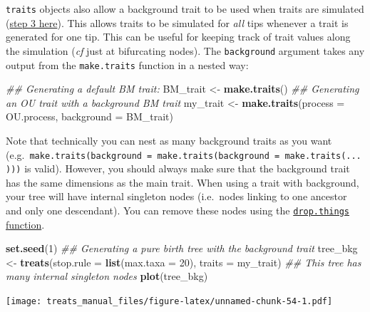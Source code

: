 \documentclass[
]{book}
\newenvironment{Shaded}{\begin{snugshade}}{\end{snugshade}}
\newcommand{\CommentTok}[1]{\textcolor[rgb]{0.56,0.35,0.01}{\textit{#1}}}
\newcommand{\DataTypeTok}[1]{\textcolor[rgb]{0.13,0.29,0.53}{#1}}
\newcommand{\DecValTok}[1]{\textcolor[rgb]{0.00,0.00,0.81}{#1}}
\newcommand{\KeywordTok}[1]{\textcolor[rgb]{0.13,0.29,0.53}{\textbf{#1}}}
\newcommand{\NormalTok}[1]{#1}
\newcommand{\StringTok}[1]{\textcolor[rgb]{0.31,0.60,0.02}{#1}}
\begin{document}
\texttt{traits} objects also allow a background trait to be used when traits are simulated (\protect\hyperlink{bdalgorithm}{step 3 here}).
This allows traits to be simulated for \emph{all} tips whenever a trait is generated for one tip.
This can be useful for keeping track of trait values along the simulation (\emph{cf} just at bifurcating nodes).
The \texttt{background} argument takes any output from the \texttt{make.traits} function in a nested way:

\begin{Shaded}
\begin{Highlighting}[]
\CommentTok{\#\# Generating a default BM trait:}
\NormalTok{BM\_trait \textless{}{-}}\StringTok{ }\KeywordTok{make.traits}\NormalTok{()}
\CommentTok{\#\# Generating an OU trait with a background BM trait}
\NormalTok{my\_trait \textless{}{-}}\StringTok{ }\KeywordTok{make.traits}\NormalTok{(}\DataTypeTok{process =}\NormalTok{ OU.process, }\DataTypeTok{background =}\NormalTok{ BM\_trait) }
\end{Highlighting}
\end{Shaded}

Note that technically you can nest as many background traits as you want (e.g.~\texttt{make.traits(background\ =\ make.traits(background\ =\ make.traits(...)))} is valid).
However, you should always make sure that the background trait has the same dimensions as the main trait.
When using a trait with background, your tree will have internal singleton nodes (i.e.~nodes linking to one ancestor and only one descendant).
You can remove these nodes using the \protect\hyperlink{dropthings}{\texttt{drop.things} function}.

\begin{Shaded}
\begin{Highlighting}[]
\KeywordTok{set.seed}\NormalTok{(}\DecValTok{1}\NormalTok{)}
\CommentTok{\#\# Generating a pure birth tree with the background trait}
\NormalTok{tree\_bkg \textless{}{-}}\StringTok{ }\KeywordTok{treats}\NormalTok{(}\DataTypeTok{stop.rule =} \KeywordTok{list}\NormalTok{(}\DataTypeTok{max.taxa =} \DecValTok{20}\NormalTok{),}
                   \DataTypeTok{traits =}\NormalTok{ my\_trait)}
\CommentTok{\#\# This tree has many internal singleton nodes}
\KeywordTok{plot}\NormalTok{(tree\_bkg)}
\end{Highlighting}
\end{Shaded}

\texttt{[image: treats\_manual\_files/figure-latex/unnamed-chunk-54-1.pdf]}
\end{document}
